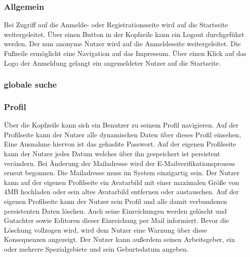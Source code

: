 \subsubsection{Allgemein}
\begin{description}
     Bei Zugriff auf die Anmelde- oder Registrationsseite
    wird auf die Startseite weitergeleitet.
     Über einen Button in der Kopfzeile kann ein Logout durchgeführt werden.
    Der nun anonyme Nutzer wird auf die Anmeldeseite weitergeleitet.
     Die Fußzeile ermöglicht eine Navigation auf das Impressum.
    \XXitem{} Über einen Klick auf das Logo der Anmeldung gelangt ein angemeldeter Nutzer auf die
    Startseite.
\end{description}

\subsubsection{globale suche}

\subsubsection{Profil}
\begin{description}
    \XXitem{} Über die Kopfzeile kann sich ein Benutzer zu seinem Profil navigieren.
    \XXitem{} Auf der Profilseite kann der Nutzer alle dynamischen Daten über dieses Profil einsehen,
    Eine Ausnahme hiervon ist das gehashte Passwort. %
     Auf der eigenen Profilseite kann der Nutzer jedes Datum %
    welches über ihn gespeichert ist persistent verändern.
     Bei Änderung der Mailadresse wird der E-Mailverifikationsprozess erneut
    begonnen. Die Mailadresse muss im System einzigartig sein. %
    \XXitem{} Der Nutzer kann auf der eigenen Profilseite ein Avatarbild mit einer maximalen
    Größe von 4MB hochladen oder sein altes Avatarbild entfernen oder austauschen. %
    \XXitem{} Auf der eigenen Profilseite kann der Nutzer sein Profil und alle damit verbundenen persistenten
    Daten löschen. Auch seine Einreichungen werden gelöscht und Gutachter sowie Editoren dieser
    Einreichung per Mail informiert. Bevor die Löschung vollzogen wird, wird dem Nutzer
    eine Warnung über diese Konsequenzen angezeigt.
     Der Nutzer kann außerdem seinen Arbeitsgeber, ein oder mehrere Spezialgebiete
    und sein Geburtsdatum angeben.
\end{description}

